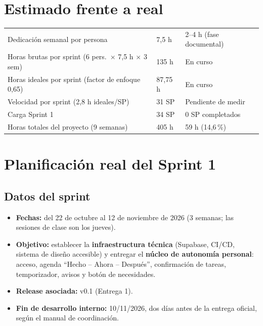 \documentclass[11pt,a4paper]{article}
\newcommand{\hl}[1]{\textcolor{gblue}{\textbf{#1}}}
\begin{document}
\section{Estimado frente a real}
\begin{longtable}{|P{6cm}|C{4.5cm}|C{4.5cm}|}
\hline
{} &  &  \\ \hline
\endhead
Dedicación semanal por persona & 7,5 h & 2--4 h (fase documental) \\ \hline
Horas brutas por sprint (6 pers.\ $\times$ 7,5 h $\times$ 3 sem) & 135 h & En curso \\ \hline
Horas ideales por sprint (factor de enfoque 0,65) & 87,75 h & En curso \\ \hline
Velocidad por sprint (2,8 h ideales/SP) & 31 SP & Pendiente de medir \\ \hline
Carga Sprint 1 & 34 SP & 0 SP completados \\ \hline
Horas totales del proyecto (9 semanas) & 405 h & 59 h (14,6\,\%) \\ \hline
\end{longtable}

\section{Planificación real del Sprint 1}
\subsection{Datos del sprint}
\begin{itemize}
\item \textbf{Fechas:} del 22 de octubre al 12 de noviembre de 2026 (3 semanas; las sesiones de clase son los jueves).
\item \textbf{Objetivo:} establecer la \hl{infraestructura técnica} (Supabase, CI/CD, sistema de diseño accesible) y entregar el \hl{núcleo de autonomía personal}: acceso, agenda ``Hecho -- Ahora -- Después'', confirmación de tareas, temporizador, avisos y botón de necesidades.
\item \textbf{Release asociada:} v0.1 (Entrega 1).
\item \textbf{Fin de desarrollo interno:} 10/11/2026, dos días antes de la entrega oficial, según el manual de coordinación.
\end{itemize}
\end{document}
